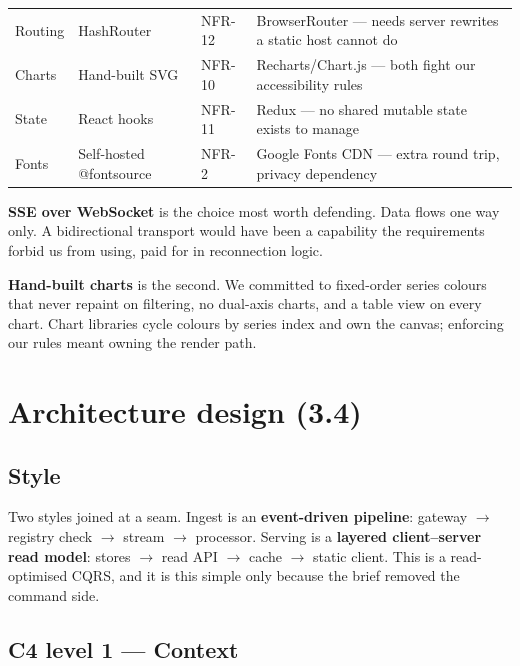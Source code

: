 \documentclass[11pt,a4paper]{article}
\begin{document}
\begin{center}
\begin{tabularx}{\textwidth}{@{}l l l X@{}}
Routing         & HashRouter    & NFR-12       & BrowserRouter --- needs server rewrites a static host cannot do \\
Charts          & Hand-built SVG & NFR-10      & Recharts/Chart.js --- both fight our accessibility rules \\
State           & React hooks   & NFR-11       & Redux --- no shared mutable state exists to manage \\
Fonts           & Self-hosted @fontsource & NFR-2 & Google Fonts CDN --- extra round trip, privacy dependency \\
\bottomrule
\end{tabularx}
\end{center}

\medskip
\noindent
\textbf{SSE over WebSocket} is the choice most worth defending. Data flows one way
only. A bidirectional transport would have been a capability the requirements forbid
us from using, paid for in reconnection logic.

\textbf{Hand-built charts} is the second. We committed to fixed-order series colours
that never repaint on filtering, no dual-axis charts, and a table view on every
chart. Chart libraries cycle colours by series index and own the canvas; enforcing
our rules meant owning the render path.

\section{Architecture design (3.4)}

\subsection*{Style}

Two styles joined at a seam. Ingest is an \textbf{event-driven pipeline}: gateway
$\rightarrow$ registry check $\rightarrow$ stream $\rightarrow$ processor. Serving is
a \textbf{layered client--server read model}: stores $\rightarrow$ read API
$\rightarrow$ cache $\rightarrow$ static client. This is a read-optimised CQRS, and
it is this simple only because the brief removed the command side.

\subsection*{C4 level 1 --- Context}
\end{document}
